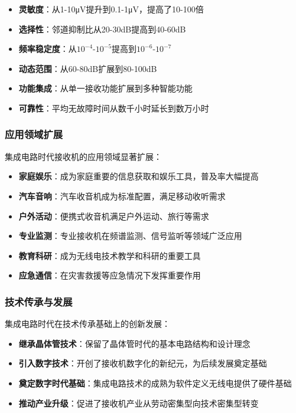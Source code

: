 \documentclass[12pt,UTF8]{ctexbook}
\begin{document}
\begin{itemize}[leftmargin=3.5em]
    \item \textbf{灵敏度}：从1-10μV提升到0.1-1μV，提高了10-100倍
    \item \textbf{选择性}：邻道抑制比从20-30dB提高到40-60dB
    \item \textbf{频率稳定度}：从$10^{-4}$-$10^{-5}$提高到$10^{-6}$-$10^{-7}$
    \item \textbf{动态范围}：从60-80dB扩展到80-100dB
    \item \textbf{功能集成}：从单一接收功能扩展到多种智能功能
    \item \textbf{可靠性}：平均无故障时间从数千小时延长到数万小时
\end{itemize}

\subsubsection{应用领域扩展}

集成电路时代接收机的应用领域显著扩展：

\begin{itemize}[leftmargin=3.5em]
    \item \textbf{家庭娱乐}：成为家庭重要的信息获取和娱乐工具，普及率大幅提高
    \item \textbf{汽车音响}：汽车收音机成为标准配置，满足移动收听需求
    \item \textbf{户外活动}：便携式收音机满足户外运动、旅行等需求
    \item \textbf{专业监测}：专业接收机在频谱监测、信号监听等领域广泛应用
    \item \textbf{教育科研}：成为无线电技术教学和科研的重要工具
    \item \textbf{应急通信}：在灾害救援等应急情况下发挥重要作用
\end{itemize}

\subsubsection{技术传承与发展}

集成电路时代在技术传承基础上的创新发展：

\begin{itemize}[leftmargin=3.5em]
    \item \textbf{继承晶体管技术}：保留了晶体管时代的基本电路结构和设计理念
    \item \textbf{引入数字技术}：开创了接收机数字化的新纪元，为后续发展奠定基础
    \item \textbf{奠定数字时代基础}：集成电路技术的成熟为软件定义无线电提供了硬件基础
    \item \textbf{推动产业升级}：促进了接收机产业从劳动密集型向技术密集型转变
\end{itemize}
\end{document}
